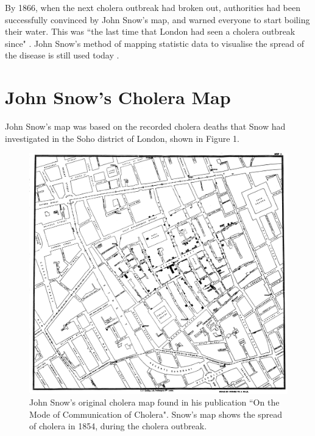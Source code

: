 \documentclass[12pt]{article}
\begin{document}
By 1866, when the next cholera outbreak had broken out, authorities had been successfully convinced by John Snow's map, and warned everyone to start boiling their water. This was ``the last time that London had seen a cholera outbreak since" \cite{tedtalk}. John Snow's method of mapping statistic data to visualise the spread of the disease is still used today \cite{channel1}. 

\section{John Snow's Cholera Map}

John Snow's map was based on the recorded cholera deaths that Snow had investigated in the Soho district of London, shown in Figure 1.

\begin{figure}
\centering
\vspace*{-3cm}
\hspace*{-3cm} 
\includegraphics[scale=0.183]{Snow-cholera-map-1}
\caption{John Snow's original cholera map found in his publication ``On the Mode of Communication of Cholera". Snow's map shows the spread of cholera in 1854, during the cholera outbreak. }
\label{fig:snow}
\end{figure}
\end{document}
